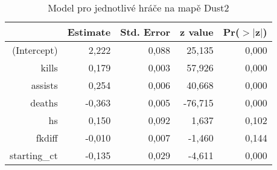 \begin{table}[H]
\centering
\begin{tabular}{rrrrr}
  \hline
 & Estimate & Std. Error & z value & Pr($>$$|$z$|$) \\ 
  \hline
(Intercept) & 2,222 & 0,088 & 25,135 & 0,000 \\ 
  kills & 0,179 & 0,003 & 57,926 & 0,000 \\ 
  assists & 0,254 & 0,006 & 40,668 & 0,000 \\ 
  deaths & -0,363 & 0,005 & -76,715 & 0,000 \\ 
  hs & 0,150 & 0,092 & 1,637 & 0,102 \\ 
  fkdiff & -0,010 & 0,007 & -1,460 & 0,144 \\ 
  starting\_ct & -0,135 & 0,029 & -4,611 & 0,000 \\ 
   \hline
\end{tabular}
\caption{\label{tab:player_model_Dust2}Model pro jednotlivé hráče na mapě Dust2} 
\end{table}
